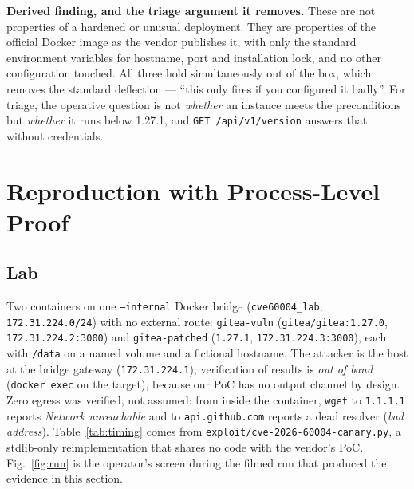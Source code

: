 \textbf{Derived finding, and the triage argument it removes.} These are not
properties of a hardened or unusual deployment. They are properties of the
official Docker image as the vendor publishes it, with only the standard
environment variables for hostname, port and installation lock, and no other
configuration touched. All three hold simultaneously out of the box, which
removes the standard deflection --- ``this only fires if you configured it
badly''. For triage, the operative question is not \emph{whether} an instance
meets the preconditions but \emph{whether} it runs below 1.27.1, and
\texttt{GET /api/v1/version} answers that without credentials.

\section{Reproduction with Process-Level Proof}
\label{sec:repro}

\subsection{Lab}

Two containers on one \texttt{--internal} Docker bridge
(\texttt{cve60004\_lab}, \texttt{172.31.224.0/24}) with no external route:
\texttt{gitea-vuln} (\texttt{gitea/gitea:1.27.0},
\texttt{172.31.224.2:3000}) and \texttt{gitea-patched} (\texttt{1.27.1},
\texttt{172.31.224.3:3000}), each with \texttt{/data} on a named volume and a
fictional hostname. The attacker is the host at the bridge gateway
(\texttt{172.31.224.1}); verification of results is \emph{out of band}
(\texttt{docker exec} on the target), because our PoC has no output channel by
design. Zero egress was verified, not assumed: from inside the container,
\texttt{wget} to \texttt{1.1.1.1} reports \emph{Network unreachable} and to
\texttt{api.github.com} reports a dead resolver (\emph{bad address}).
Table~\ref{tab:timing} comes from \texttt{exploit/cve-2026-60004-canary.py}, a
stdlib-only reimplementation that shares no code with the vendor's PoC.
Fig.~\ref{fig:run} is the operator's screen during the filmed run that produced the
evidence in this section.

